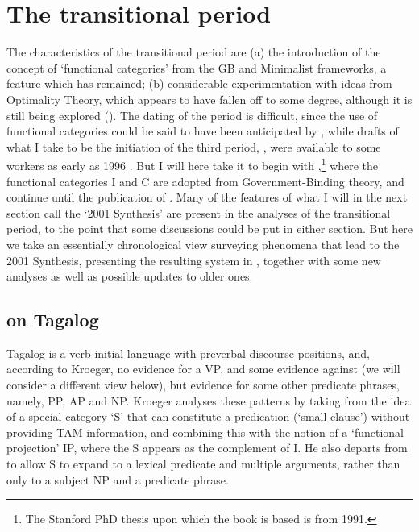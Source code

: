 \documentclass[output=paper,hidelinks]{langscibook}
\begin{document}
\section{The transitional period}
The characteristics of the transitional period are (a) the introduction of the
concept of `functional categories' from the GB and Minimalist frameworks, a feature which
has remained; (b) considerable experimentation with ideas from Optimality Theory,
which appears to have fallen off to some degree, although it is still being explored
().
The dating of the period is difficult,  since the use of functional categories could be
said to have been anticipated by \citet{Falk84}, while drafts of what I take
to be the initiation of the third period, \citet{bresnan2001lexical}, were
available to some workers as early as 1996 \citep[15]{nordlinger1998constructive}.
But I will here take it to begin with \citet{Kroeger93},\footnote
 {The Stanford PhD thesis upon which the book is based is from 1991.}
where the functional
categories I and C are adopted from Government-Binding theory,
and continue until the publication of \citet{bresnan2001lexical}.  
Many of the features of what I will in the next section call the `2001 Synthesis' are
present in the analyses of the transitional period, to the point that some discussions
could be put in either section.  But here we take an essentially chronological view
surveying phenomena that lead to the 2001 Synthesis, presenting the resulting system
in , together with some new analyses as well as possible updates
to older ones.

\subsection{\citet{Kroeger93} on Tagalog}
Tagalog is a verb-initial language with preverbal discourse positions, and, according
to Kroeger, no evidence for a VP, and some evidence against (we will consider a different view below),
but evidence for some other predicate phrases, namely,
PP, AP and NP.  Kroeger analyses these patterns by taking from \citet{ChungMcCloskey1987}
the idea of a special category `S' that can constitute a predication (`small clause')
without providing TAM information, and combining this with the notion of
a `functional projection' IP, where the S appears as the complement of I.  He
also departs from \citeauthor{ChungMcCloskey1987} to allow S to expand to a lexical predicate
and multiple arguments, rather than only to a subject NP and a predicate
phrase.
\end{document}
